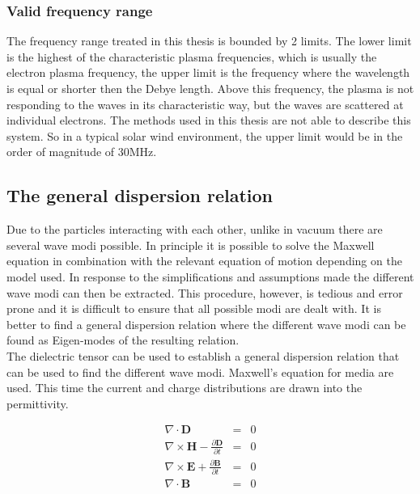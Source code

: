 \documentclass[a4paper,11pt]{thesis}
\begin{document}
\subsubsection{Valid frequency range}
The frequency range treated in this thesis is bounded by 2 limits. The lower limit is the highest of the characteristic plasma frequencies,
which is usually the electron plasma frequency, the upper limit is the frequency where the wavelength is equal or shorter then the Debye
length. Above this frequency, the plasma is not responding to the waves in its characteristic way, but the waves are scattered at individual
electrons. The methods used in this thesis are not able to describe this system. So in a typical solar wind environment, the upper limit would
be in the order of magnitude of 30MHz.

\subsection{The general dispersion relation}\label{subsec_disp_rel}
Due to the particles interacting with each other, unlike in vacuum
there are several wave modi possible. In principle it is possible to
solve the Maxwell equation in combination with the relevant equation
of motion depending on the model used. In response to the
simplifications and assumptions made the different wave modi can
then be extracted. This procedure, however, is tedious and error
prone and it is difficult to ensure that all possible modi are dealt
with. It is better to find a general dispersion relation where the
different wave modi can be found as Eigen-modes of the resulting
relation.\\

The dielectric tensor can be used to establish a general dispersion
relation that can be used to find the different wave modi. Maxwell's
equation for media are used. This time the current and charge
distributions are drawn into the permittivity.


\begin{eqnarray}
  \nabla \cdot \mathbf{D} &=& 0 \\
\nabla \times \mathbf{H}- \frac{\partial \mathbf{D}}{\partial t}&=&  0\label{maxwell2} \\
\nabla \times \mathbf{E} + \frac{\partial \mathbf{B}}{\partial t} &=& 0 \label{maxwell3} \\
\nabla \cdot \mathbf{B} &=& 0
\end{eqnarray}
\end{document}
